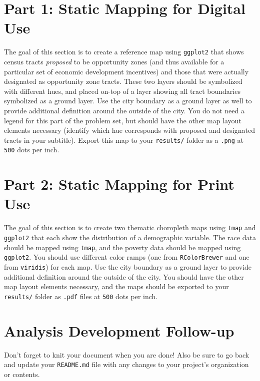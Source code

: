 \documentclass{tufte-handout}
\begin{document}
\vspace{5mm}
\section{Part 1: Static Mapping for Digital Use}
The goal of this section is to create a reference map using \texttt{ggplot2} that shows census tracts \textit{proposed} to be opportunity zones (and thus available for a particular set of economic development incentives) and those that were actually designated as opportunity zone tracts. These two layers should be symbolized with different hues, and placed on-top of a layer showing all tract boundaries symbolized as a ground layer. Use the city boundary as a ground layer as well to provide additional definition around the outside of the city. You do not need a legend for this part of the problem set, but should have the other map layout elements necessary (identify which hue corresponds with proposed and designated tracts in your subtitle). Export this map to your \texttt{results/} folder as a \texttt{.png} at \texttt{500} dots per inch.

\vspace{5mm}
\section{Part 2: Static Mapping for Print Use}
The goal of this section is to create two thematic choropleth maps using \texttt{tmap} and \texttt{ggplot2} that each show the distribution of a demographic variable. The race data should be mapped using \texttt{tmap}, and the poverty data should be mapped using \texttt{ggplot2}. You should use different color ramps (one from \texttt{RColorBrewer} and one from \texttt{viridis}) for each map. Use the city boundary as a ground layer to provide additional definition around the outside of the city. You should have the other map layout elements necessary, and the maps should be exported to your \texttt{results/} folder as \texttt{.pdf} files at \texttt{500} dots per inch.

\vspace{5mm}
\section{Analysis Development Follow-up}
Don't forget to knit your document when you are done! Also be sure to go back and update your \texttt{README.md} file with any changes to your project's organization or contents.

\end{document}

